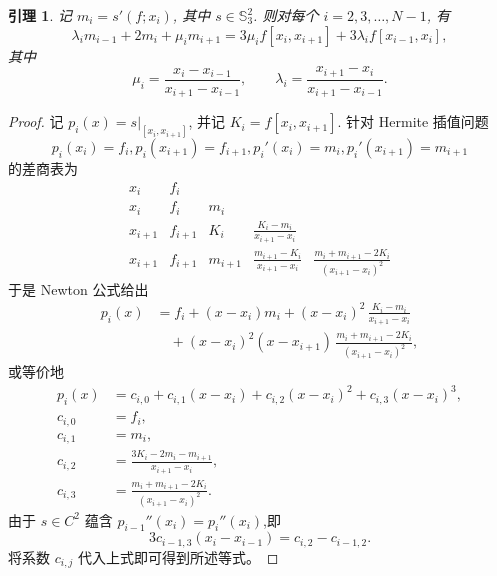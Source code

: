 \documentclass[a4paper]{ctexart}
\newtheorem{lemma}[theorem]{引理}
\numberwithin{theorem}{section}
\numberwithin{equation}{section}
\numberwithin{figure}{section}
\numberwithin{remark}{section}
\begin{document}
\begin{lemma}
    \label{lem::spline_m_relation}
记 $m_i=s'(f; x_i)$, 其中 $s\in \mathbb{S}_3^{2}$. 
则对每个 $i=2,3,\ldots,N-1$, 有
\begin{equation}
    \label{eq::spline_m_relation}
\lambda_i m_{i-1}+2 m_i+\mu_i m_{i+1}
=3\mu_i f[x_i,x_{i+1}]+3\lambda_i f[x_{i-1},x_i],
\end{equation}
其中
\begin{equation}
    \label{eq::spline_lambda_mu}
\mu_i=\frac{x_i-x_{i-1}}{x_{i+1}-x_{i-1}},\qquad
\lambda_i=\frac{x_{i+1}-x_i}{x_{i+1}-x_{i-1}}.
\end{equation}
\end{lemma}

\begin{proof}
记 $p_i(x)=s\big|_{[x_i,x_{i+1}]}$, 并记 $K_i=f[x_i,x_{i+1}]$. 
针对 Hermite 插值问题 
$$
p_i(x_i)=f_i, p_i(x_{i+1})=f_{i+1}, p_i'(x_i)=m_i, p_i'(x_{i+1})=m_{i+1}
$$ 
的差商表为
\[
\begin{array}{c|llll}
x_i & f_i&&\\
x_i & f_i& m_i&\\
x_{i+1} & f_{i+1}& K_i&\frac{K_i-m_i}{x_{i+1}-x_i}\\
x_{i+1} & f_{i+1}& m_{i+1}&\frac{m_{i+1}-K_i}{x_{i+1}-x_i}&\frac{m_i+m_{i+1}-2K_i}{(x_{i+1}-x_i)^2} 
\end{array}
\]
于是 Newton 公式给出
\begin{equation}
    \label{eq::spline_newton}
\begin{aligned}
p_i(x)
&=f_i+(x-x_i)m_i+(x-x_i)^2\,\frac{K_i-m_i}{x_{i+1}-x_i}\\
&\quad+(x-x_i)^2(x-x_{i+1})\,\frac{m_i+m_{i+1}-2K_i}{(x_{i+1}-x_i)^2},
\end{aligned}
\end{equation}
或等价地
\begin{equation}
    \label{eq::spline_cubic}
    \begin{aligned}
p_i(x) &=c_{i,0}+c_{i,1}(x-x_i)+c_{i,2}(x-x_i)^2+c_{i,3}(x-x_i)^3,\\
c_{i,0} &=f_i,\\
c_{i,1} &=m_i,\\
c_{i,2} &=\frac{3K_i-2m_i-m_{i+1}}{x_{i+1}-x_i},\\
c_{i,3} &=\frac{m_i+m_{i+1}-2K_i}{(x_{i+1}-x_i)^2}.
    \end{aligned}
\end{equation}
由于 $s\in C^{2}$ 蕴含 $p_{i-1}''(x_i)=p_i''(x_i)$,即
\begin{equation*}
3c_{i-1,3}(x_i-x_{i-1})=c_{i,2}-c_{i-1,2}.
\end{equation*}
将系数 $c_{i,j}$ 代入上式即可得到所述等式。
\end{proof}
\end{document}
